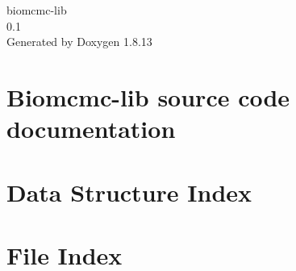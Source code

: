 \documentclass[twoside]{article}
\newcommand{\+}{\discretionary{\mbox{\scriptsize$\hookleftarrow$}}{}{}}
\begin{document}
\hypersetup{pageanchor=false,
             bookmarksnumbered=true,
             pdfencoding=unicode
            }
\begin{titlepage}
\vspace*{7cm}
\begin{center}%
{\Large biomcmc-\/lib \\[1ex]\large 0.\+1 }\\
\vspace*{1cm}
{\large Generated by Doxygen 1.8.13}\\
\end{center}
\end{titlepage}
\tableofcontents
{}
\hypersetup{pageanchor=true}

\section{Biomcmc-\/lib source code documentation}
\label{index}\hypertarget{index}{}
\section{Data Structure Index}

\section{File Index}

\end{document}

